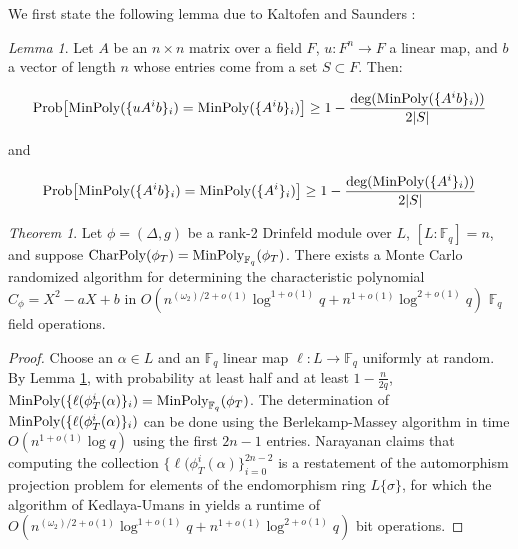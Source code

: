 \documentclass{acmart}
\theoremstyle{remark}
\numberwithin{equation}{section}
\newtheorem{theorem}{Theorem}
\newtheorem{lemma}{Lemma}
\newcommand{\minpol}{\textnormal{MinPoly}_{\mathbb{F}_q}}
\begin{document}
We first state the following lemma due to Kaltofen and Saunders \cite{Kaltofen-saun:1991:WMS:646027.676885} :

\begin{lemma}\label{kalsaun}
Let $A$ be an $n\times n$ matrix over a field $F$, $u: F^n \to F$ a linear map, and $b$ a vector of length $n$ whose entries come from a set $S \subset F$. Then:

\[ \textnormal{Prob}\big[\textnormal{MinPoly}(\{uA^ib\}_i) = \textnormal{MinPoly}(\{A^ib\}_i)\big] \geq 1 - \frac{\textnormal{deg}(\textnormal{MinPoly}(\{A^ib\}_i))}{2|S|} \]

\noindent and

\[ \textnormal{Prob}\big[\textnormal{MinPoly}(\{A^ib\}_i) = \textnormal{MinPoly}(\{A^i\}_i)\big] \geq 1 - \frac{\textnormal{deg}(\textnormal{MinPoly}(\{A^i\}_i))}{2|S|} \]



\end{lemma}


\begin{theorem}
Let $\phi = (\Delta, g)$ be a rank-2 Drinfeld module over $L$, $[L: \mathbb{F}_q] = n$, and suppose $\textnormal{CharPoly}(\phi_T) = \minpol(\phi_T)$. There exists a Monte Carlo randomized algorithm for determining the characteristic polynomial $C_{\phi} = X^2 -aX + b$ in $O(n^{(\omega_2)/2 + o(1)}\log^{1+o(1)}q + n^{1+o(1)}\log^{2+o(1)}q)$ $\mathbb{F}_q$ field operations.
\end{theorem}

\begin{proof}

Choose an $\alpha \in L$ and an $\mathbb{F}_q$ linear map $\ell: L \to \mathbb{F}_q$ uniformly at random. By Lemma \ref{kalsaun}, with probability at least half and at least $1 - \frac{n}{2q}$, $\textnormal{MinPoly}(\{\ell(\phi_T^i(\alpha)\}_i) = \minpol(\phi_T)$. The determination of $\textnormal{MinPoly}(\{\ell(\phi_T^i(\alpha)\}_i)$ can be done using the Berlekamp-Massey algorithm in time $O(n^{1+ o(1)} \log q)$ using the first $2n - 1$ entries. Narayanan claims that computing the collection $\{ \ell(\phi_T^i(\alpha)\}_{i=0}^{2n-2}$ is a restatement of the automorphism projection problem for elements of the endomorphism ring $L\{\sigma\}$, for which the algorithm of Kedlaya-Umans in \cite{Kedlaya:2011:FPF:2340436.2340448} yields a runtime of $O(n^{(\omega_2)/2 + o(1)}\log^{1+o(1)}q + n^{1+o(1)}\log^{2+o(1)}q)$ bit operations.
\end{proof}
\end{document}
